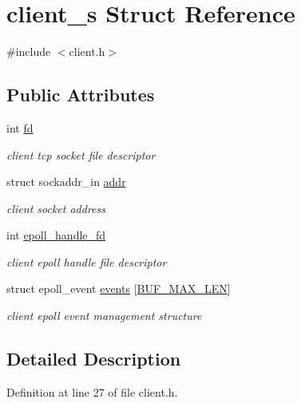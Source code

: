 \hypertarget{structclient__s}{\section{client\-\_\-s Struct Reference}
\label{structclient__s}
}


{\ttfamily \#include $<$client.\-h$>$}

\subsection*{Public Attributes}
\begin{DoxyCompactItemize}
\item 
int \hyperlink{structclient__s_a9babf0c4dea4b555e6b87a47f4ca98cd}{fd}
\begin{DoxyCompactList}\small\item\em client tcp socket file descriptor \end{DoxyCompactList}\item 
struct sockaddr\-\_\-in \hyperlink{structclient__s_a0462afe1661e70a0c69fa24f39387d0f}{addr}
\begin{DoxyCompactList}\small\item\em client socket address \end{DoxyCompactList}\item 
int \hyperlink{structclient__s_aadebb75dc03b9055f20d18e6a78865c4}{epoll\-\_\-handle\-\_\-fd}
\begin{DoxyCompactList}\small\item\em client epoll handle file descriptor \end{DoxyCompactList}\item 
struct epoll\-\_\-event \hyperlink{structclient__s_a06588602dcf6728b79196b73271edf97}{events} \mbox{[}\hyperlink{client_8h_aae114cdd7784a59af222f175dac6312b}{B\-U\-F\-\_\-\-M\-A\-X\-\_\-\-L\-E\-N}\mbox{]}
\begin{DoxyCompactList}\small\item\em client epoll event management structure \end{DoxyCompactList}\end{DoxyCompactItemize}


\subsection{Detailed Description}


Definition at line 27 of file client.\-h.



